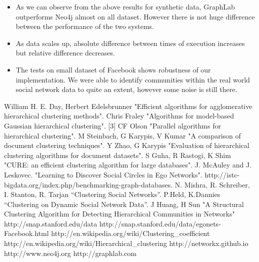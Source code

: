 \documentclass[11pt,onecolumn]{article}
\begin{document}





\begin{itemize}
\item As we can observe from the above results for synthetic data, GraphLab outperforms Neo4j almost on all dataset. However there is not huge difference between the performance of the two systems.
\item As data scales up, absolute difference between times of execution increases but relative difference decreases.
\item The tests on small dataset of Facebook shows robustness of our implementation. We were able to identify communities within the real world social network data to quite an extent, however some noise is still there.
\end{itemize}
\begin{thebibliography}{1}
\small
{} William H. E. Day, Herbert Edelsbrunner "Efficient algorithms for agglomerative hierarchical clustering methods".
Chris Fraley "Algorithms for model-based Gaussian hierarchical clustering".
[3] CF Olson "Parallel algorithms for hierarchical clustering".
M Steinbach, G Karypis, V Kumar "A comparison of document clustering techniques".
Y Zhao, G Karypis "Evaluation of hierarchical clustering algorithms for document datasets".
S Guha, R Rastogi, K Shim "CURE: an efficient clustering algorithm for large databases".
J. McAuley and J. Leskovec. "Learning to Discover Social Circles in Ego Networks".
http://istc-bigdata.org/index.php/benchmarking-graph-databases.
N. Mishra, R. Schreiber, I. Stanton, R. Tarjan “Clustering Social Networks”.
P.Held, K.Dannies “Clustering on Dynamic Social Network Data”.
 J Huang, H Sun "A Structural Clustering Algorithm for Detecting Hierarchical Communities in Networks"
 http://snap.stanford.edu/data
 http://snap.stanford.edu/data/egonets-Facebook.html
 http://en.wikipedia.org/wiki/Clustering\_coefficient
 http://en.wikipedia.org/wiki/Hierarchical\_clustering
 http://networkx.github.io
 http://www.neo4j.org
 http://graphlab.com

\end{thebibliography}
\end{document}
